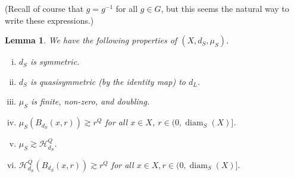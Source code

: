 \documentclass{amsart}
\DeclareMathOperator{\diam}{diam}
\theoremstyle{plain}
\newtheorem{lemma}[theorem]{Lemma}
\theoremstyle{definition}
\numberwithin{equation}{section}
\numberwithin{theorem}{section}
\begin{document}
(Recall of course that $g=g^{-1}$ for all $g\in G$, but this seems the natural way to write these expressions.)

\begin{lemma}\label{lem:symmetrize}
We have the following properties of $(X, d_{S}, \mu_{S})$.
\begin{enumerate}[(i)]
\item \label{ds:sym} $d_S$ is symmetric.
\item\label{ds:qs} $d_{S}$ is quasisymmetric (by the identity map) to $d_L$.
\item\label{ds:doubling} $\mu_{S}$ is finite, non-zero, and doubling. 
\item\label{ds:lowerbound} $\mu_{S}(B_{d_S}(x,r)) \gtrsim r^Q$ for all $x\in X$, $r\in (0,\diam_S(X)]$.
\item\label{ds:hausdorff} $\mu_S \gtrsim \mathcal{H}^Q_{d_S}$.
\item\label{ds:positive} $\mathcal{H}^Q_{d_{S}}(B_{d_S}(x,r)) \gtrsim r^Q$ for all $x\in X, r\in (0,\diam_S(X)].$
\end{enumerate}

\end{lemma}
\end{document}
